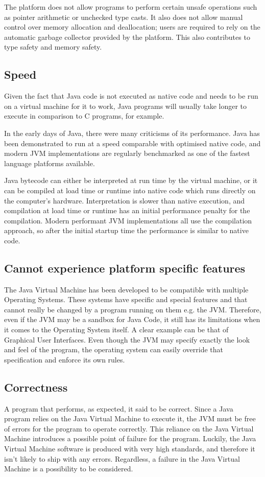 \documentclass[english,runningheads,a4paper]{llncs}[2018/03/10]
\begin{document}
The platform does not allow programs to perform certain unsafe operations such
as pointer arithmetic or unchecked type casts. It also does not allow manual
control over memory allocation and deallocation; users are required to rely on
the automatic garbage collector provided by the platform. This also contributes
to type safety and memory safety.

\subsection*{Speed}
Given the fact that Java code is not executed as native code and needs to be run
on a virtual machine for it to work, Java programs will usually take longer to
execute in comparison to C programs, for example.

In the early days of Java, there were many criticisms of its performance. Java
has been demonstrated to run at a speed comparable with optimised native code,
and modern JVM implementations are regularly benchmarked as one of the fastest
language platforms available.

Java bytecode can either be interpreted at run time by the virtual machine, or
it can be compiled at load time or runtime into native code which runs directly
on the computer's hardware. Interpretation is slower than native execution, and
compilation at load time or runtime has an initial performance penalty for the
compilation. Modern performant JVM implementations all use the compilation
approach, so after the initial startup time the performance is similar to native
code.

\subsection*{Cannot experience platform specific features}
The Java Virtual Machine has been developed to be compatible with multiple
Operating Systems. These systems have specific and special features and that
cannot really be changed by a program running on them e.g. the JVM. Therefore,
even if the JVM may be a sandbox for Java Code, it still has its limitations
when it comes to the Operating System itself. A clear example can be that of
Graphical User Interfaces. Even though the JVM may specify exactly the look and
feel of the program, the operating system can easily override that specification
and enforce its own rules.

\subsection*{Correctness}
A program that performs, as expected, it said to be correct. Since a Java
program relies on the Java Virtual Machine to execute it, the JVM must be free
of errors for the program to operate correctly. This reliance on the Java
Virtual Machine introduces a possible point of failure for the program. Luckily,
the Java Virtual Machine software is produced with very high standards, and
therefore it isn't likely to ship with any errors. Regardless, a failure in the
Java Virtual Machine is a possibility to be considered.
\end{document}
